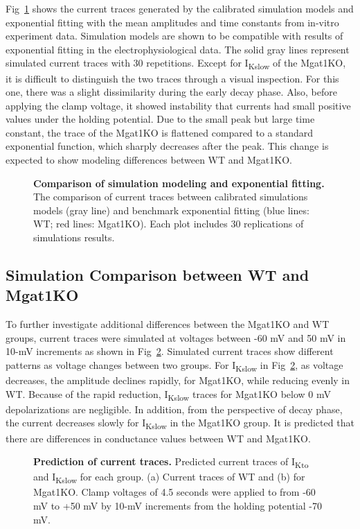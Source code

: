 \documentclass[10pt,letterpaper]{article}
\begin{document}
Fig~\ref{fig6} shows the current traces generated by the calibrated simulation models and exponential fitting with the mean amplitudes and time constants from in-vitro experiment data. Simulation models are shown to be compatible with results of exponential fitting in the electrophysiological data. The solid gray lines represent simulated current traces with 30 repetitions. Except for I\textsubscript{Kslow} of the Mgat1KO, it is difficult to distinguish the two traces through a visual inspection. For this one, there was a slight dissimilarity during the early decay phase. Also, before applying the clamp voltage, it showed instability that currents had small positive values under the holding potential. Due to the small peak but large time constant, the trace of the Mgat1KO is flattened compared to a standard exponential function, which sharply decreases after the peak. This change is expected to show modeling differences between WT and Mgat1KO.

\begin{figure}[!ht]
    \centering
    \caption{{\bf Comparison of simulation modeling and exponential fitting.} 
    The comparison of current traces between calibrated simulations models (gray line) and benchmark exponential fitting (blue lines: WT; red lines: Mgat1KO). Each plot includes 30 replications of simulations results.}
    \label{fig6}
\end{figure}

\subsection*{Simulation Comparison between WT and Mgat1KO}
To further investigate additional differences between the Mgat1KO and WT groups, current traces were simulated at voltages between -60 mV and 50 mV in 10-mV increments as shown in Fig~\ref{fig7}. Simulated current traces show different patterns as voltage changes between two groups. For I\textsubscript{Kslow} in Fig~\ref{fig7}, as voltage decreases, the amplitude declines rapidly, for Mgat1KO, while reducing evenly in WT. Because of the rapid reduction, I\textsubscript{Kslow} traces for Mgat1KO below 0 mV depolarizations are negligible. In addition, from the perspective of decay phase, the current decreases slowly for I\textsubscript{Kslow} in the Mgat1KO group. It is predicted that there are differences in conductance values between WT and Mgat1KO.

\begin{figure}[!ht]
    \centering
    \caption{{\bf Prediction of current traces.} 
    Predicted current traces of I\textsubscript{Kto} and I\textsubscript{Kslow} for each group. (a) Current traces of WT and (b) for Mgat1KO. Clamp voltages of 4.5 seconds were applied to from -60 mV to +50 mV by 10-mV increments from the holding potential -70 mV.}
    \label{fig7}
\end{figure}
\end{document}
